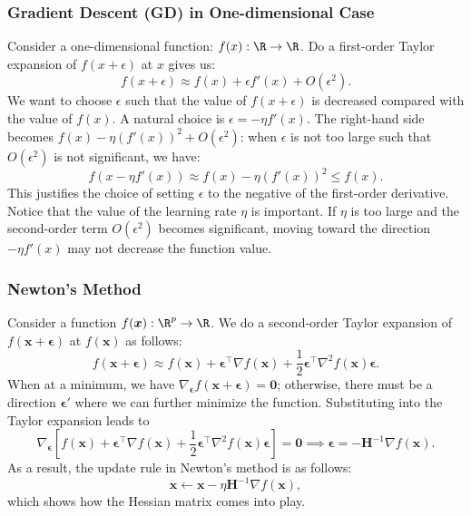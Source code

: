     \subsubsection{Gradient Descent (GD) in One-dimensional Case}
    Consider a one-dimensional function: $f(x): \R \rightarrow \R$.
    Do a first-order Taylor expansion of $f(x + \epsilon)$ at $x$ gives us:
        \begin{equation}
                f(x + \epsilon) \approx f(x) + \epsilon f'(x) + O(\epsilon^2).
        \end{equation}
    We want to choose $\epsilon$ such that the value of $f(x + \epsilon)$ is decreased compared with the value of $f(x)$.
    A natural choice is $\epsilon = -\eta f'(x)$.
    The right-hand side becomes $f(x) - \eta (f'(x))^2 + O(\epsilon^2)$: when $\epsilon$ is not too large such that $O(\epsilon^2)$ is not significant, we have:
        \begin{equation}
            f(x - \eta f'(x)) \approx f(x) - \eta (f'(x))^2 \le f(x).
        \end{equation}
    This justifies the choice of setting $\epsilon$ to the negative of the first-order derivative.
    Notice that the value of the learning rate $\eta$ is important.
    If $\eta$ is too large and the second-order term $O(\epsilon^2)$ becomes significant, moving toward the direction $-\eta f'(x)$ may not decrease the function value.
    
    \subsubsection{Newton's Method}\label{newton-method}
        Consider a function $f(\bm{x}): \R^\nfeat \rightarrow \R$.
        We do a second-order Taylor expansion of $f(\bm{x} + \bm{\epsilon})$ at $f(\bm{x})$ as follows:
            \begin{equation}
                f(\bm{x} + \bm{\epsilon}) \approx f(\bm{x}) + \bm{\epsilon}^{\top} \nabla f(\bm{x}) + \frac{1}{2} \bm{\epsilon}^\top \nabla^2 f(\bm{x}) \bm{\epsilon}.
            \end{equation}
        When at a minimum, we have $\nabla_{\bm{\epsilon}} f(\bm{x}+\bm{\epsilon}) = \bm{0}$; otherwise, there must be a direction $\bm{\epsilon}'$ where we can further minimize the function.
        Substituting into the Taylor expansion leads to 
            \begin{equation}
                \nabla_{\bm{\epsilon}}\left[ f(\bm{x}) + \bm{\epsilon}^{\top} \nabla f(\bm{x}) + \frac{1}{2} \bm{\epsilon}^\top \nabla^2 f(\bm{x}) \bm{\epsilon}\right] = \bm{0} \implies \bm{\epsilon} = -\bm{H}^{-1} \nabla f(\bm{x}).
            \end{equation}
        As a result, the update rule in Newton's method is as follows:
            \begin{equation}
                \bm{x} \leftarrow \bm{x} - \eta \bm{H}^{-1} \nabla f(\bm{x}),
            \end{equation}
        which shows how the Hessian matrix comes into play.
    

